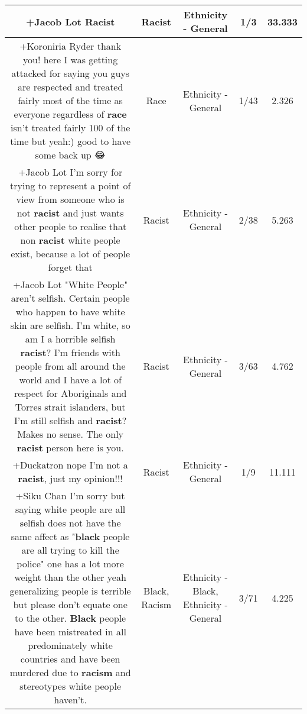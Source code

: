 \documentclass[11pt]{article}
\newlength\mylength
\begin{document}
\begin{center}
\begin{longtable}{|C{.65\mylength}|C{.30\mylength}|C{.12\mylength}|C{.12\mylength}|C{.12\mylength}|}
  \small +Jacob Lot Racist\normalsize   & Racist & Ethnicity - General & 1/3 & 33.333 \\  \hline
  \small +Koroniria Ryder thank you! here I was getting attacked for saying you guys are respected and treated fairly most of the time as everyone regardless of \textbf{race} isn't treated fairly 100 of the time but yeah:) good to have some back up 😂\normalsize   & Race & Ethnicity - General & 1/43 & 2.326 \\  \hline
  \small +Jacob Lot I'm sorry for trying to represent a point of view from someone who is not \textbf{racist} and just wants other people to realise that non \textbf{racist} white people exist, because a lot of people forget that\normalsize   & Racist & Ethnicity - General & 2/38 & 5.263 \\  \hline
  \small +Jacob Lot "White People" aren't selfish. Certain people who happen to have white skin are selfish. I'm white, so am I a horrible selfish \textbf{racist}? I'm friends with people from all around the world and I have a lot of respect for Aboriginals and Torres strait islanders, but I'm still selfish and \textbf{racist}? Makes no sense. The only \textbf{racist} person here is you.\normalsize   & Racist & Ethnicity - General & 3/63 & 4.762 \\  \hline
  \small +Duckatron nope I'm not a \textbf{racist}, just my opinion!!!\normalsize   & Racist & Ethnicity - General & 1/9 & 11.111 \\  \hline
  \small +Siku Chan I'm sorry but saying white people are all selfish does not have the same affect as "\textbf{black} people are all trying to kill the police" one has a lot more weight than the other yeah generalizing people is terrible but please don't equate one to the other. \textbf{Black} people have been mistreated in all predominately white countries and have been murdered due to \textbf{racism} and stereotypes white people haven't.\normalsize   & Black, Racism & Ethnicity - Black, Ethnicity - General & 3/71 & 4.225 \\  \hline

\end{longtable}
\end{center}
\end{document}
